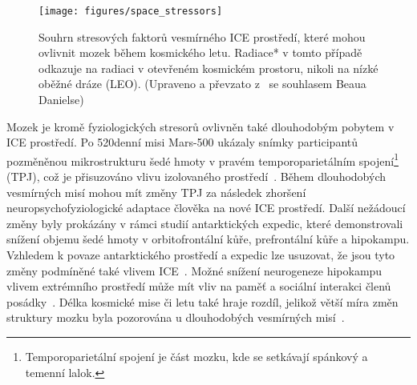 \begin{figure}[!htb]
    \begin{center}
        \texttt{[image: figures/space\_stressors]}
        \caption{Souhrn stresových faktorů vesmírného \gls{ICE} prostředí, které
            mohou ovlivnit mozek během kosmického letu. Radiace* v tomto případě
            odkazuje na radiaci v otevřeném kosmickém prostoru, nikoli na nízké
            oběžné dráze (\gls{LEO}). (Upraveno a převzato
            z~\cite{Roy2021,Hodkinson2017} se souhlasem Beaua Danielse)}
        \label{fig:factors_neuro}
    \end{center}
\end{figure}

Mozek je kromě fyziologických stresorů ovlivněn také dlouhodobým pobytem v
\gls{ICE} prostředí. Po 520denní misi Mars-500 ukázaly snímky participantů
pozměněnou mikrostrukturu šedé hmoty v pravém temporoparietálním
spojení\footnote{Temporoparietální spojení je část mozku, kde se setkávají
spánkový a temenní lalok.} (\gls{TPJ}), což je přisuzováno vlivu izolovaného
prostředí~\cite{Brem2020}. Během dlouhodobých vesmírných misí mohou mít změny
TPJ za následek zhoršení neuropsychofyziologické adaptace člověka na nové ICE
prostředí. Další nežádoucí změny byly prokázány v rámci studií antarktických
expedic, které demonstrovali snížení objemu šedé hmoty v orbitofrontální kůře,
prefrontální kůře a hipokampu. Vzhledem k povaze antarktického prostředí a
expedic lze usuzovat, že jsou tyto změny podmíněné také vlivem
\gls{ICE}~\cite{Stahn2019}. Možné snížení neurogeneze hipokampu vlivem
extrémního prostředí může mít vliv na paměť a sociální interakci členů
posádky~\cite{Roy2021}. Délka kosmické mise či letu také hraje rozdíl, jelikož
větší míra změn struktury mozku byla pozorována u dlouhodobých vesmírných
misí~\cite{Roberts2017}.